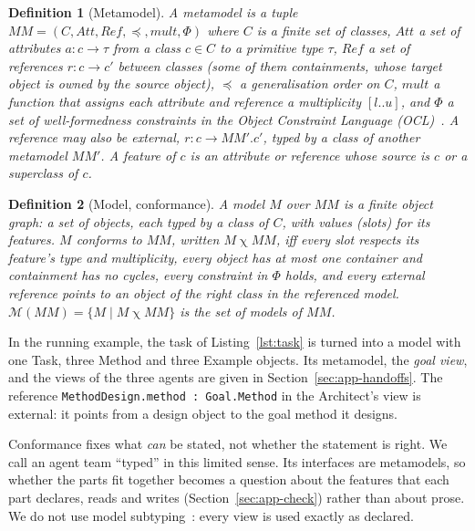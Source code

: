 \documentclass[pdflatex,sn-mathphys-num]{sn-jnl}
\theoremstyle{thmstyleone}%
\theoremstyle{thmstyletwo}%
\theoremstyle{thmstylethree}%
\newtheorem{definition}{Definition}%
\newcommand{\MM}{\mathit{MM}}
\newcommand{\Mods}[1]{\mathcal{M}(#1)}
\newcommand{\cls}[1]{\textsf{#1}}
\newcommand{\code}[1]{\texttt{#1}}
\newcommand{\conformsTo}{\mathrel{\chi}}
\begin{document}
\begin{definition}[Metamodel]\label{def:metamodel}
A metamodel is a tuple $\MM=(C,\mathit{Att},\mathit{Ref},\preceq,\mathit{mult},\Phi)$
where $C$ is a finite set of classes, $\mathit{Att}$ a set of attributes
$a:c\to\tau$ from a class $c\in C$ to a primitive type $\tau$, $\mathit{Ref}$ a
set of references $r:c\to c'$ between classes (some of them
\emph{containments}, whose target object is owned by the source object),
$\preceq$ a generalisation order on $C$, $\mathit{mult}$ a function that assigns
each attribute and reference a multiplicity $[l..u]$, and $\Phi$ a set of
well-formedness constraints in the Object Constraint Language
(OCL)~\cite{omg2014ocl}. A reference may also be \emph{external},
$r:c\to\MM'.c'$, typed by a class of another metamodel $\MM'$. A \emph{feature}
of $c$ is an attribute or reference whose source is $c$ or a superclass of $c$.
\end{definition}

\begin{definition}[Model, conformance]\label{def:model}
A model $M$ over $\MM$ is a finite object graph: a set of objects, each typed by
a class of $C$, with values (slots) for its features. $M$ \emph{conforms to}
$\MM$, written $M\conformsTo\MM$, iff every slot respects its feature's type
and multiplicity, every object has at most one container and containment has
no cycles, every constraint in $\Phi$ holds, and every external reference
points to an object of the right class in the referenced model.
$\Mods{\MM}=\{M\mid M\conformsTo\MM\}$ is the set of models of $\MM$.
\end{definition}

In the running example, the task of Listing~\ref{lst:task} is turned into a
model with one \cls{Task}, three \cls{Method} and three \cls{Example} objects.
Its metamodel, the \emph{goal view}, and the views of the three agents are
given in Section~\ref{sec:app-handoffs}.
The reference \code{MethodDesign.method : Goal.Method} in the Architect's view
is external: it points from a design object to the goal method it designs.

Conformance fixes what \emph{can} be stated, not whether the statement is
right. We call an agent team ``typed'' in this limited sense. Its interfaces are
metamodels, so whether the parts fit together becomes a question about the
features that each part declares, reads and writes
(Section~\ref{sec:app-check}) rather than about prose. We do not use model
subtyping~\cite{steel2007typing}: every view is used exactly as declared.
\end{document}
